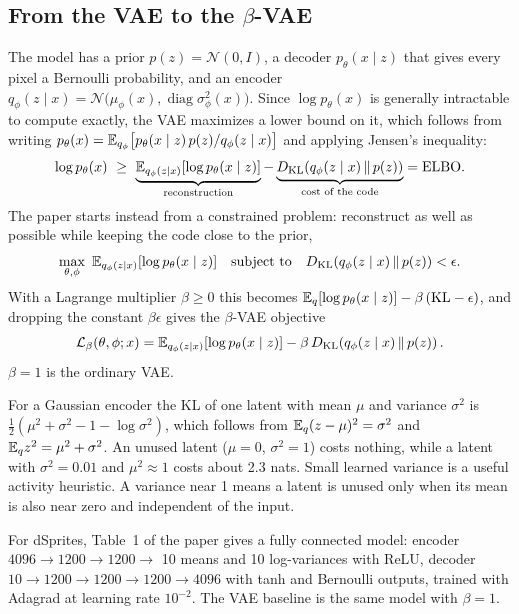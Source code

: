 \subsection{From the VAE to the \texorpdfstring{$\beta$}{beta}-VAE}
The model has a prior $p(z)=\mathcal N(0,I)$, a decoder $p_\theta(x\mid z)$ that gives every pixel a Bernoulli probability, and an encoder $q_\phi(z\mid x)=\mathcal N\big(\mu_\phi(x),\operatorname{diag}\sigma^2_\phi(x)\big)$. Since $\log p_\theta(x)$ is generally intractable to compute exactly, the VAE maximizes a lower bound on it, which follows from writing $p_\theta(x)=\mathbb{E}_{q_\phi}\big[p_\theta(x\mid z)\,p(z)/q_\phi(z\mid x)\big]$ and applying Jensen's inequality:
\[
\log p_\theta(x)\ \ge\ \underbrace{\E_{q_\phi(z\mid x)}[\log p_\theta(x\mid z)]}_{\text{reconstruction}}-\underbrace{\KL{q_\phi(z\mid x)}{p(z)}}_{\text{cost of the code}}=\text{ELBO}.
\]
The paper starts instead from a constrained problem: reconstruct as well as possible while keeping the code close to the prior,
\[
\max_{\theta,\phi}\ \mathbb{E}_{q_\phi(z\mid x)}[\log p_\theta(x\mid z)]\quad\text{subject to}\quad D_{\mathrm{KL}}\!\left(q_\phi(z\mid x)\,\|\,p(z)\right)<\epsilon .
\]
With a Lagrange multiplier $\beta\ge0$ this becomes $\mathbb{E}_q[\log p_\theta(x\mid z)]-\beta\,(\mathrm{KL}-\epsilon)$, and dropping the constant $\beta\epsilon$ gives the $\beta$-VAE objective
\[
\mathcal L_\beta(\theta,\phi;x)=\mathbb{E}_{q_\phi(z\mid x)}[\log p_\theta(x\mid z)]-\beta\,D_{\mathrm{KL}}\!\left(q_\phi(z\mid x)\,\|\,p(z)\right) .
\]
$\beta=1$ is the ordinary VAE.

For a Gaussian encoder the KL of one latent with mean $\mu$ and variance $\sigma^2$ is $\tfrac12(\mu^2+\sigma^2-1-\log\sigma^2)$, which follows from $\mathbb{E}_q(z-\mu)^2=\sigma^2$ and $\mathbb{E}_q z^2=\mu^2+\sigma^2$. An unused latent ($\mu=0$, $\sigma^2=1$) costs nothing, while a latent with $\sigma^2=0.01$ and $\mu^2\approx1$ costs about 2.3 nats. Small learned variance is a useful activity heuristic. A variance near 1 means a latent is unused only when its mean is also near zero and independent of the input.

For dSprites, Table~1 of the paper gives a fully connected model: encoder $4096\to1200\to1200\to$ 10 means and 10 log-variances with ReLU, decoder $10\to1200\to1200\to1200\to4096$ with tanh and Bernoulli outputs, trained with Adagrad at learning rate $10^{-2}$. The VAE baseline is the same model with $\beta=1$.

